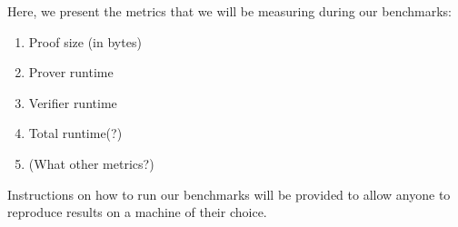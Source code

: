 Here, we present the metrics that we will be measuring during our benchmarks:
\begin{enumerate}
    \item Proof size (in bytes)
    \item Prover runtime
    \item Verifier runtime
    \item Total runtime(?)
    \item (What other metrics?)
\end{enumerate}

Instructions on how to run our benchmarks will be provided to allow anyone to reproduce results on a machine of their choice.